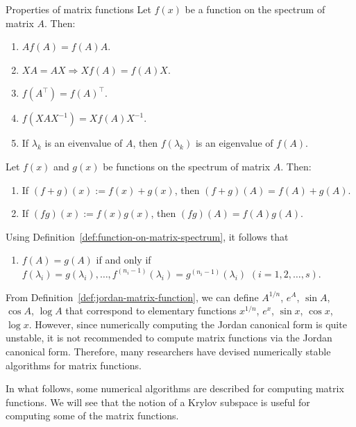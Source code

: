 \begin{Theorem}{{Properties of matrix functions}}\label{thm:matrix-function-properties}
{Let $f(x)$ be a function on the spectrum of matrix $A$. Then:}
\begin{enumerate}[label=(\arabic*)]
\item $Af(A)=f(A)A$.
\item $XA=AX\Rightarrow Xf(A)=f(A)X$.
\item $f(A^{\top})=f(A)^{\top}$.
\item $f(XAX^{-1})=Xf(A)X^{-1}$.
\item {If $\lambda_k$ is an eivenvalue of $A$, then $f(\lambda_k)$ is an eigenvalue of $f(A)$.}
\end{enumerate}
{Let $f(x)$ and $g(x)$ be functions on the spectrum of matrix $A$. Then:}
\begin{enumerate}[label=(\arabic*),start=6]
\item {If $(f+g)(x):=f(x)+g(x)$, then $(f+g)(A)=f(A)+g(A)$.}
\item {If $(fg)(x):=f(x)g(x)$, then $(fg)(A)=f(A)g(A)$.}
\end{enumerate}
{Using Definition~\ref{def:function-on-matrix-spectrum}, it follows that}
\begin{enumerate}[label=(\arabic*),start=8]
\item {$f(A)=g(A)$ if and only if $f(\lambda_i)=g(\lambda_i),\ldots,f^{(n_i-1)}(\lambda_i)=g^{(n_i-1)}(\lambda_i)$ $(i=1,2,\ldots,s)$.}
\end{enumerate}
\end{Theorem}

{From Definition~\ref{def:jordan-matrix-function}, we can define $A^{1/n}$, $e^A$, $\sin A$, $\cos A$, $\log A$ that correspond to elementary functions $x^{1/n}$, $e^x$, $\sin x$, $\cos x$, $\log x$. However, since numerically computing the Jordan canonical form is quite unstable, it is not recommended to compute matrix functions via the Jordan canonical form. Therefore, many researchers have devised numerically stable algorithms for matrix functions.}

{In what follows, some numerical algorithms are described for computing matrix functions. We will see that the notion of a Krylov subspace is useful for computing some of the matrix functions.}
